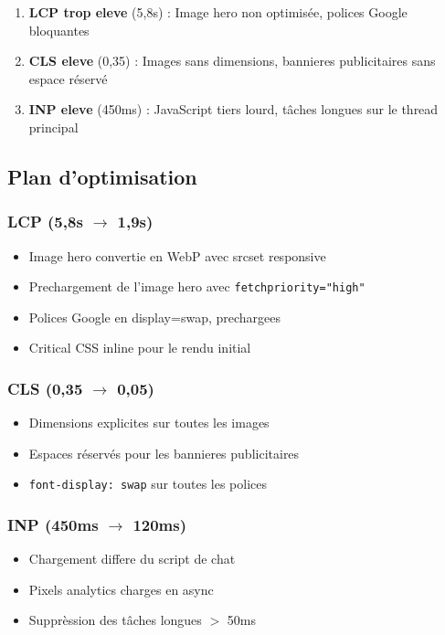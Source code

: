 \begin{enumerate}
    \item \textbf{LCP trop eleve} (5,8s) : Image hero non optimisée, polices Google bloquantes
    \item \textbf{CLS eleve} (0,35) : Images sans dimensions, bannieres publicitaires sans espace réservé
    \item \textbf{INP eleve} (450ms) : JavaScript tiers lourd, tâches longues sur le thread principal
\end{enumerate}

\subsection{Plan d'optimisation}

\subsubsection{LCP (5,8s $\rightarrow$ 1,9s)}
\begin{itemize}
    \item Image hero convertie en WebP avec srcset responsive
    \item Prechargement de l'image hero avec \texttt{fetchpriority="high"}
    \item Polices Google en display=swap, prechargees
    \item Critical CSS inline pour le rendu initial
\end{itemize}

\subsubsection{CLS (0,35 $\rightarrow$ 0,05)}
\begin{itemize}
    \item Dimensions explicites sur toutes les images
    \item Espaces réservés pour les bannieres publicitaires
    \item \texttt{font-display: swap} sur toutes les polices
\end{itemize}

\subsubsection{INP (450ms $\rightarrow$ 120ms)}
\begin{itemize}
    \item Chargement differe du script de chat
    \item Pixels analytics charges en async
    \item Supprèssion des tâches longues $>$ 50ms
\end{itemize}

